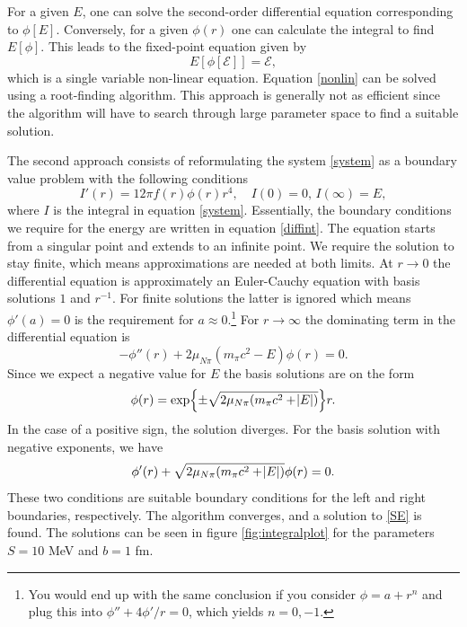 For a given $E$, one can solve the second-order differential equation corresponding to $\phi[E]$. Conversely, for a given $\phi(r)$ one can calculate the integral to find $E[\phi]$. This leads to the fixed-point equation given by
\begin{equation} \label{nonlin}
	E[\phi[\mathcal{E}]] = \mathcal{E},
\end{equation}
which is a single variable non-linear equation. Equation \eqref{nonlin} can be solved using a root-finding algorithm. This approach is generally not as efficient since the algorithm will have to search through large parameter space to find a suitable solution.

The second approach consists of reformulating the system \eqref{system} as a boundary value problem with the following conditions
\begin{equation}\label{diffint}
	I'(r) = 12\pi f(r)\phi(r)r^4, \quad I(0)=0, \, I(\infty)=E,
\end{equation}
where $I$ is the integral in equation \eqref{system}. Essentially, the boundary conditions we require for the energy are written in equation \eqref{diffint}. The equation starts from a singular point and extends to an infinite point. We require the solution to stay finite, which means approximations are needed at both limits. At $r\rightarrow 0$ the differential equation is approximately an Euler-Cauchy equation with basis solutions $1$ and $r^{-1}$. For finite solutions the latter is ignored which means $\phi'(a)=0$ is the requirement for $a\approx 0$.\footnote{You would end up with the same conclusion if you consider $\phi=a+r^n$ and plug this into $\phi''+4\phi'/r=0$, which yields $n=0,-1$.} For $r\rightarrow \infty$ the dominating term in the differential equation is
\begin{equation}
	-\phi''(r)+2\mu_{N\pi}(m_\pi c^2-E)\phi(r)=0.
\end{equation}
Since we expect a negative value for $E$ the basis solutions are on the form
\begin{equation}
	\phi(r)=\exp{\pm\sqrt{2\mu_{N\pi}(m_\pi c^2+\abs{E})}}r.
\end{equation}
In the case of a positive sign, the solution diverges. For the basis solution with negative exponents, we have
\begin{equation}
	\phi'(r)+\sqrt{2\mu_{N\pi}(m_\pi c^2 +\abs{E})}\phi(r)=0.
\end{equation}
These two conditions are suitable boundary conditions for the left and right boundaries, respectively. The algorithm converges, and a solution to \eqref{SE} is found. The solutions can be seen in figure \ref{fig:integralplot} for the parameters $S=10$ MeV and $b=1$ fm.
